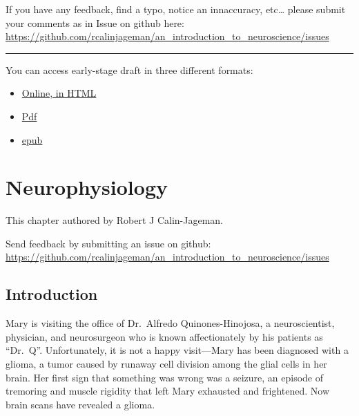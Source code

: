 \documentclass[
]{book}
\begin{document}
If you have any feedback, find a typo, notice an innaccuracy, etc\ldots{} please submit your comments as in Issue on github here: \url{https://github.com/rcalinjageman/an_introduction_to_neuroscience/issues}

\begin{center}\rule{0.5\linewidth}{0.5pt}\end{center}

You can access early-stage draft in three different formats:

\begin{itemize}
\item
  \href{https://rcalinjageman.github.io/an_introduction_to_neuroscience/}{Online, in HTML}
\item
  \href{https://github.com/rcalinjageman/an_introduction_to_neuroscience/raw/main/docs/Intro_to_Neuroscience.pdf}{Pdf}
\item
  \href{https://github.com/rcalinjageman/an_introduction_to_neuroscience/raw/main/docs/Intro_to_Neuroscience.epub}{epub}
\end{itemize}

\hypertarget{neurophysiology}{%
\chapter{Neurophysiology}\label{neurophysiology}}

This chapter authored by Robert J Calin-Jageman.

Send feedback by submitting an issue on github: \url{https://github.com/rcalinjageman/an_introduction_to_neuroscience/issues}

\hypertarget{neurophysiology-introduction}{%
\section{Introduction}\label{neurophysiology-introduction}}

Mary is visiting the office of Dr.~Alfredo Quinones-Hinojosa, a neuroscientist, physician, and neurosurgeon who is known affectionately by his patients as ``Dr.~Q''. Unfortunately, it is not a happy visit---Mary has been diagnosed with a glioma, a tumor caused by runaway cell division among the glial cells in her brain. Her first sign that something was wrong was a seizure, an episode of tremoring and muscle rigidity that left Mary exhausted and frightened. Now brain scans have revealed a glioma.
\end{document}
